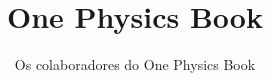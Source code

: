 \documentclass[11pt,a4paper,twoside,openany]{book}
\title{One Physics Book}
\author{Os colaboradores do One Physics Book}
\date{\bookdate}
\begin{document}
\frontmatter




\tableofcontents

\mainmatter



\appendix
\part{\omsolutionspart}


\backmatter
\printindex
\end{document}
